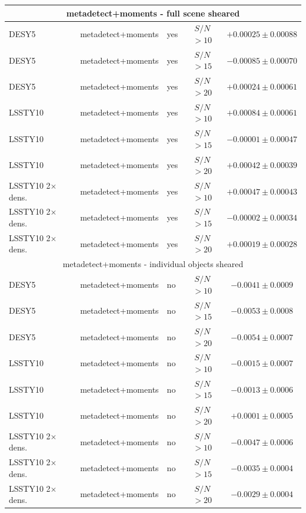 \documentclass[fleqn,useAMS,usenatbib]{mnras}
\newcommand{\snr}{$S/N$}
\begin{document}
\begin{table}
\begin{tabular}{|l|l|l|c|c|}
    \hline
    \multicolumn{5}{c}{metadetect+moments - full scene sheared}\\
    \hline
    DESY5   & metadetect+moments & yes & \snr$ > 10$ & $+0.00025 \pm 0.00088$  \\
    DESY5   & metadetect+moments & yes & \snr$ > 15$ & $-0.00085 \pm 0.00070$  \\
    DESY5   & metadetect+moments & yes & \snr$ > 20$ & $+0.00024 \pm 0.00061$  \\
    \hline
    LSSTY10  & metadetect+moments & yes & \snr$ > 10$ & $+0.00084 \pm 0.00061$  \\
    LSSTY10  & metadetect+moments & yes & \snr$ > 15$ & $-0.00001 \pm 0.00047$  \\
    LSSTY10  & metadetect+moments & yes & \snr$ > 20$ & $+0.00042 \pm 0.00039$  \\
    \hline
    LSSTY10 2$\times$ dens. & metadetect+moments & yes & \snr$ > 10$ & $+0.00047 \pm 0.00043$  \\
    LSSTY10 2$\times$ dens. & metadetect+moments & yes & \snr$ > 15$ & $-0.00002 \pm 0.00034$  \\
    LSSTY10 2$\times$ dens. & metadetect+moments & yes & \snr$ > 20$ & $+0.00019 \pm 0.00028$  \\
    \hline

    \hline
    \multicolumn{5}{c}{metadetect+moments - individual objects sheared}\\
    \hline
    DESY5   & metadetect+moments & no & \snr$ > 10$ & $-0.0041 \pm 0.0009$  \\
    DESY5   & metadetect+moments & no & \snr$ > 15$ & $-0.0053 \pm 0.0008$  \\
    DESY5   & metadetect+moments & no & \snr$ > 20$ & $-0.0054 \pm 0.0007$  \\
    \hline
    LSSTY10  & metadetect+moments & no & \snr$ > 10$ & $-0.0015 \pm 0.0007$  \\
    LSSTY10  & metadetect+moments & no & \snr$ > 15$ & $-0.0013 \pm 0.0006$  \\
    LSSTY10  & metadetect+moments & no & \snr$ > 20$ & $+0.0001 \pm 0.0005$  \\
    \hline
    LSSTY10 2$\times$ dens. & metadetect+moments & no & \snr$ > 10$ & $-0.0047 \pm 0.0006$  \\
    LSSTY10 2$\times$ dens. & metadetect+moments & no & \snr$ > 15$ & $-0.0035 \pm 0.0004$  \\
    LSSTY10 2$\times$ dens. & metadetect+moments & no & \snr$ > 20$ & $-0.0029 \pm 0.0004$  \\
    \hline
  \end{tabular}

\end{table}
\end{document}
